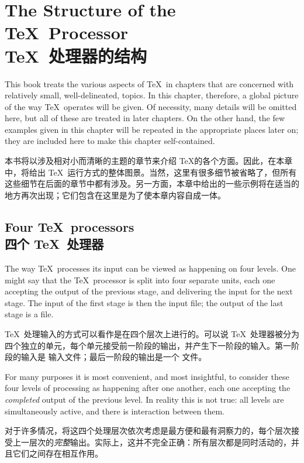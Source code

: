 \chapter{The Structure of the \TeX\ Processor\\\TeX\ 处理器的结构}

This book treats the various aspects of \TeX\ in chapters
that are concerned with relatively small, well-delineated,
topics. In this chapter, therefore, 
a global picture of the way \TeX\ operates will be given.
Of necessity, many details will be omitted here, but all of
these are treated in later chapters. On the other hand,
the few examples given in this chapter will be repeated
in the appropriate places later on; they are included here
to make this chapter self-contained.

本书将以涉及相对小而清晰的主题的章节来介绍 \TeX 的各个方面。因此，在本章中，将给出 \TeX\ 运行方式的整体图景。当然，这里有很多细节被省略了，但所有这些细节在后面的章节中都有涉及。另一方面，本章中给出的一些示例将在适当的地方再次出现；它们包含在这里是为了使本章内容自成一体。



\section{Four \TeX\protect\ processors\\四个 \TeX\ 处理器}

The way \TeX\ processes its input can be viewed as
happening on four levels. One might  say that
the \TeX\ processor is split into four separate units,
each one accepting the output of the previous stage, and
delivering the input for the next stage. The input of
the first stage is then the  input file; the output
of the last stage is a  file.

\TeX\ 处理输入的方式可以看作是在四个层次上进行的。可以说 \TeX\ 处理器被分为四个独立的单元，每个单元接受前一阶段的输出，并产生下一阶段的输入。第一阶段的输入是  输入文件；最后一阶段的输出是一个  文件。

For many purposes it is most convenient, and most insightful,
to consider these four levels of processing as happening
after one another, each one accepting the {\em completed\/}
output of the previous level. In reality this is not true:
all levels are simultaneously
active, and there is interaction between them.

对于许多情况，将这四个处理层次依次考虑是最方便和最有洞察力的，每个层次接受上一层次的{\em 完整}输出。实际上，这并不完全正确：所有层次都是同时活动的，并且它们之间存在相互作用。



